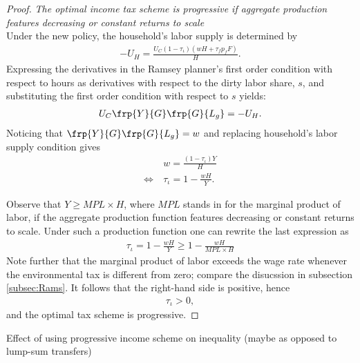 \begin{proof} \textit{The optimal income tax scheme is progressive if aggregate production features decreasing or constant returns to scale}\\
Under the new policy, the household's labor supply is determined by
\begin{align}
-U_H=\frac{U_C (1-\tau_{\iota})(wH+\tau_f p_fF)}{H}.
\end{align}
Expressing the derivatives in the Ramsey planner's first order condition with respect to hours as derivatives with respect to the dirty labor share, $s$, and substituting the first order condition with respect to $s$ yields:
\begin{align}
U_C \frp{Y}{G}\frp{G}{L_g}=-U_H.
\end{align}
Noticing that $\frp{Y}{G}\frp{G}{L_g}=w$ and replacing household's labor supply condition gives
\begin{align}
& w=\frac{(1-\tau_\iota)Y}{H}\\
\Leftrightarrow\ & \tau_\iota=1-\frac{wH}{Y}. 
\end{align} 


Observe that $Y\geq MPL \times H$, where $MPL$ stands in for the marginal product of labor, if the aggregate production function features decreasing or constant returns to scale. Under such a production function one can rewrite the last expression as
\begin{align}
\tau_{\iota}=1-\frac{wH}{Y}\geq 1-\frac{w H}{MPL \times H}
\end{align}
 Note further that the marginal product of labor exceeds the wage rate whenever the environmental tax is different from zero; compare the disucssion in subsection \ref{subsec:Rams}. It follows that the right-hand side is positive, hence
\begin{align}
\tau_{\iota}>0,
\end{align}
and the optimal tax scheme is progressive.
\end{proof}

\begin{prop}
Effect of using progressive income scheme on inequality (maybe as opposed to lump-sum transfers)
\end{prop}


